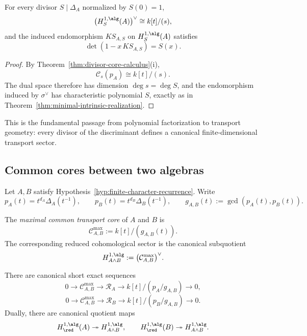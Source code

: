 \begin{theorem}
\label{thm:sector-determinant}
For every divisor \(S\mid \Delta_A\) normalized by \(S(0)=1\),
\[
\bigl(H^{1,\alg}_S(A)\bigr)^\vee\cong k[t]/(s),
\]
and the induced endomorphism \(KS_{A,S}\) on \(H^{1,\alg}_S(A)\) satisfies
\[
\det(1-x\,KS_{A,S})=S(x).
\]
\end{theorem}

\begin{proof}
By Theorem~\ref{thm:divisor-core-calculus}\textup{(i)},
\[
\mathcal C_s(p_A)\cong k[t]/(s).
\]
The dual space therefore has dimension \(\deg s=\deg S\), and the endomorphism induced by \(\sigma^\vee\) has characteristic polynomial \(S\), exactly as in Theorem~\ref{thm:minimal-intrinsic-realization}.
\end{proof}

\begin{remark}
This is the fundamental passage from polynomial factorization to transport geometry:
every divisor of the discriminant defines a canonical finite-dimensional transport sector.
\end{remark}

\subsection{Common cores between two algebras}

Let \(A,B\) satisfy Hypothesis~\ref{hyp:finite-character-recurrence}.
Write
\[
p_A(t)=t^{d_A}\Delta_A(t^{-1}),
\qquad
p_B(t)=t^{d_B}\Delta_B(t^{-1}),
\qquad
g_{A,B}(t):=\gcd(p_A(t),p_B(t)).
\]

\begin{definition}
The \emph{maximal common transport core} of \(A\) and \(B\) is
\[
\mathcal C^{\max}_{A,B}:=k[t]/(g_{A,B}(t)).
\]
The corresponding reduced cohomological sector is the canonical subquotient
\[
H^{1,\alg}_{A\wedge B}:=\bigl(\mathcal C^{\max}_{A,B}\bigr)^\vee.
\]
\end{definition}

\begin{theorem}
\label{thm:common-core-exact-sequences}
There are canonical short exact sequences
\[
0\longrightarrow \mathcal C^{\max}_{A,B}\longrightarrow \mathcal R_A\longrightarrow k[t]/(p_A/g_{A,B})\longrightarrow 0,
\]
\[
0\longrightarrow \mathcal C^{\max}_{A,B}\longrightarrow \mathcal R_B\longrightarrow k[t]/(p_B/g_{A,B})\longrightarrow 0.
\]
Dually, there are canonical quotient maps
\[
H^{1,\alg}_{\red}(A)\twoheadrightarrow H^{1,\alg}_{A\wedge B},
\qquad
H^{1,\alg}_{\red}(B)\twoheadrightarrow H^{1,\alg}_{A\wedge B}.
\]
\end{theorem}

